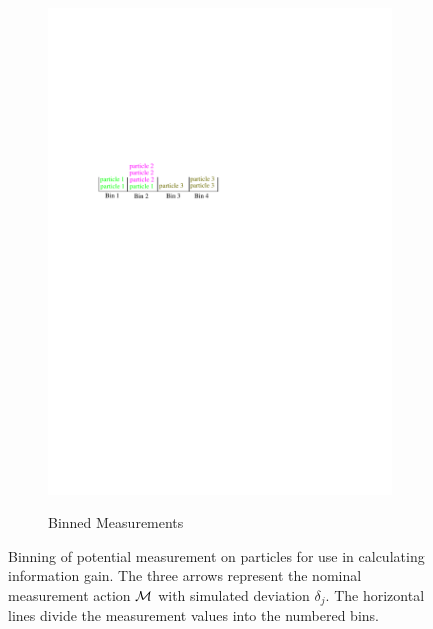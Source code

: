 \documentclass[../thesis.tex]{subfiles}
\begin{document}
\begin{figure}
\begin{subfigure}[b]{0.38\linewidth}
        \includegraphics[width=\linewidth, clip, trim=1.2in 7in 4.1in 3.7in]{./Localization/bins_sorted}
        \label{figure:bins}
        \caption{Binned Measurements}
    \end{subfigure}
    \hspace*{\fill}
\caption{Binning of potential measurement on particles for use in calculating information gain. The three arrows represent the nominal measurement action $\mathcal{M}$ with simulated deviation $\delta_j$. The horizontal lines divide the measurement values into the numbered bins.}
\label{fig:bins}
\end{figure}
\end{document}
